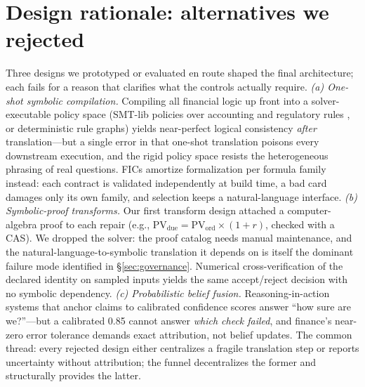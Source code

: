 \section{Design rationale: alternatives we rejected}\label{sec:rationale}
Three designs we prototyped or evaluated en route shaped the final architecture; each fails for a reason that clarifies what the controls actually require.
\emph{(a) One-shot symbolic compilation.}
Compiling all financial logic up front into a solver-executable policy space (SMT-lib policies over accounting and regulatory rules \cite{akinfaderin2025verafi}, or deterministic rule graphs) yields near-perfect logical consistency \emph{after} translation---but a single error in that one-shot translation poisons every downstream execution, and the rigid policy space resists the heterogeneous phrasing of real questions.
FICs amortize formalization per formula family instead: each contract is validated independently at build time, a bad card damages only its own family, and selection keeps a natural-language interface.
\emph{(b) Symbolic-proof transforms.}
Our first transform design attached a computer-algebra proof to each repair (e.g., $\mathrm{PV}_{\mathrm{due}}=\mathrm{PV}_{\mathrm{ord}}\times(1+r)$, checked with a CAS).
We dropped the solver: the proof catalog needs manual maintenance, and the natural-language-to-symbolic translation it depends on is itself the dominant failure mode identified in \S\ref{sec:governance}.
Numerical cross-verification of the declared identity on sampled inputs yields the same accept/reject decision with no symbolic dependency.
\emph{(c) Probabilistic belief fusion.}
Reasoning-in-action systems that anchor claims to calibrated confidence scores answer ``how sure are we?''---but a calibrated 0.85 cannot answer \emph{which check failed}, and finance's near-zero error tolerance demands exact attribution, not belief updates.
The common thread: every rejected design either centralizes a fragile translation step or reports uncertainty without attribution; the funnel decentralizes the former and structurally provides the latter.

